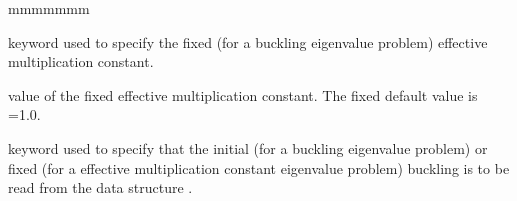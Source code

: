 \begin{ListeDeDescription}{mmmmmmm}
\item[\moc{KEFF}] keyword used to specify the fixed (for a buckling eigenvalue
problem) effective multiplication constant. 

\item[\dusa{valk}] value of the fixed effective multiplication constant. The
fixed default value is =1.0.

\item[\moc{IDEM}] keyword used to specify that the initial (for a buckling
eigenvalue problem) or fixed (for a effective multiplication constant eigenvalue
problem) buckling is to be read from the data structure . 

\end{ListeDeDescription}
\eject
